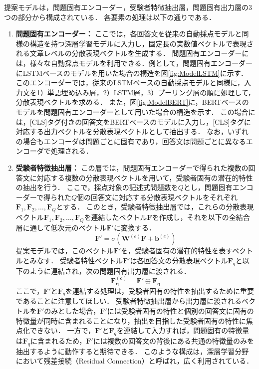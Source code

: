 \documentclass[a4paper,12pt,oneside,openany]{jsbook}
\begin{document}
提案モデルは，問題固有エンコーダー，受験者特徴抽出層，問題固有出力層の3つの部分から構成されている．
各要素の処理は以下の通りである．
\begin{enumerate}
\item {\bf 問題固有エンコーダー：} ここでは，各回答文を従来の自動採点モデルと同様の構造を持つ深層学習モデルに入力し，固定長の実数値ベクトルで表現される文章レベルの分散表現ベクトルを生成する．
問題固有エンコーダーには，様々な自動採点モデルを利用できる．例として，問題固有エンコーダーにLSTMベースのモデルを用いた場合の構造を図\ref{fig:ModelLSTM}に示す．
このエンコーダーでは，従来のLSTMベースの自動採点モデルと同様に，入力文を1）単語埋め込み層，2）LSTM層，3）プーリング層の順に処理して，分散表現ベクトルを求める．
また，図\ref{fig:ModelBERT}に，BERTベースのモデルを問題固有エンコーダーとして用いた場合の構造を示す．
この場合には，[CLS]タグ付きの回答文をBERTベースのモデルに入力し，[CLS]タグに対応する出力ベクトルを分散表現ベクトルとして抽出する．
なお，いずれの場合もエンコーダは問題ごとに固有であり，回答文は問題ごとに異なるエンコーダで処理される．

\item {\bf 受験者特徴抽出層：} この層では，問題固有エンコーダーで得られた複数の回答文に対応する複数の分散表現ベクトルを用いて，受験者固有の潜在的特性の抽出を行う．
ここで，採点対象の記述式問題数を$Q$とし，問題固有エンコーダーで得られた$Q$個の回答文に対応する分散表現ベクトルをそれぞれ$\bm{F}_1, \bm{F}_2, \ldots, \bm{F}_Q$とする．
このとき，受験者特徴抽出層では，これらの分散表現ベクトル$\bm{F}_1, \bm{F}_2, \ldots, \bm{F}_Q$を連結したベクトル$\bm{F}$を作成し，それを以下の全結合層に通して低次元のベクトル$\bm{F}'$に変換する．
\begin{equation}
\bm{F}'=\sigma(\mathbf{W}^{(e)}\bm{F}+\mathbf{b}^{(e)})
\end{equation}
提案モデルでは，このベクトル$\bm{F}'$を，受験者固有の潜在的特性を表すベクトルとみなす．
受験者特性ベクトル$\bm{F}'$は各回答文の分散表現ベクトル$\bm{F}_q$と以下のように連結され，次の問題固有出力層に渡される．
\begin{equation}
\bm{F^{(c)}_q} = \bm{F}' \oplus \mathbf{F_{q}}
\end{equation}
ここで，$\bm{F}'$と$\bm{F}_q$を連結する処理は，受験者固有の特性を抽出するために重要であることに注意してほしい．
受験者特徴抽出層から出力層に渡されるベクトルを$\bm{F}'$のみとした場合，$\bm{F}'$には受験者固有の特性と個別の回答文に固有の特徴量が同時に含まれることになり，抽出を目指した受験者固有の特性に焦点化できない．
一方で，$\bm{F}'$と$\bm{F}_q$を連結して入力すれば，問題固有の特徴量は$\bm{F}_q$に含まれるため，$\bm{F}'$には複数の回答文の背後にある共通の特徴量のみを抽出するように動作すると期待できる．
このような構成は，深層学習分野において残差接続（Residual Connection）と呼ばれ，広く利用されている．


\end{enumerate}
\end{document}
